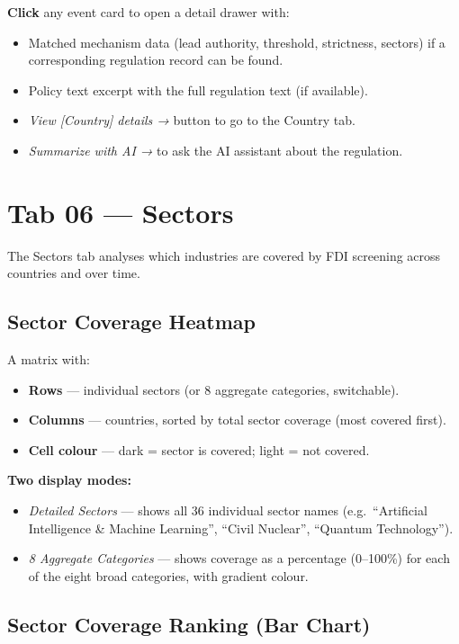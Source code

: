 \documentclass[12pt,a4paper]{article}
\newcommand{\uielem}[1]{\textit{#1}}
\begin{document}
\textbf{Click} any event card to open a detail drawer with:
\begin{itemize}
  \item Matched mechanism data (lead authority, threshold, strictness, sectors) if a corresponding regulation record can be found.
  \item Policy text excerpt with the full regulation text (if available).
  \item \uielem{View [Country] details →} button to go to the Country tab.
  \item \uielem{Summarize with AI →} to ask the AI assistant about the regulation.
\end{itemize}

\section{Tab 06 — Sectors}
\label{sec:sectors}

The Sectors tab analyses which industries are covered by FDI screening across countries and over time.

\subsection{Sector Coverage Heatmap}

A matrix with:
\begin{itemize}
  \item \textbf{Rows} — individual sectors (or 8 aggregate categories, switchable).
  \item \textbf{Columns} — countries, sorted by total sector coverage (most covered first).
  \item \textbf{Cell colour} — dark = sector is covered; light = not covered.
\end{itemize}

\textbf{Two display modes:}
\begin{itemize}
  \item \uielem{Detailed Sectors} — shows all 36 individual sector names (e.g.\ ``Artificial Intelligence \& Machine Learning'', ``Civil Nuclear'', ``Quantum Technology'').
  \item \uielem{8 Aggregate Categories} — shows coverage as a percentage (0--100\%) for each of the eight broad categories, with gradient colour.
\end{itemize}

\subsection{Sector Coverage Ranking (Bar Chart)}
\end{document}
